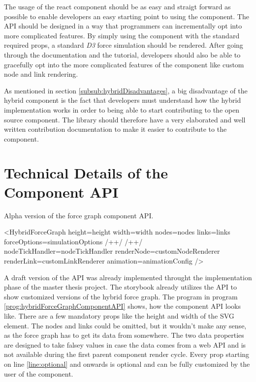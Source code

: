 The usage of the react component should be as easy and straigt forward as possible to enable developers an easy starting point to using the component. The API should be designed in a way that programmers can incrementally opt into more complicated features. By simply using the component with the standard required props, a standard \emph{D3} force simulation should be rendered. After going through the documentation and the tutorial, developers should also be able to gracefully opt into the more complicated features of the component like custom node and link rendering.

As mentioned in section \ref{subsub:hybridDisadvantages}, a big disadvantage of the hybrid component is the fact that developers must understand how the hybrid implementation works in order to being able to start contributing to the open source component. The library should therefore have a very elaborated and well written contribution documentation to make it easier to contribute to the component.

\section{Technical Details of the Component API}

\begin{program}
\caption{Alpha version of the force graph component API.}
\label{prog:hybridForceGraphComponentAPI}
\begin{JsCode}
<HybridForceGraph 
  height={height}
  width={width}
  nodes={nodes}
  links={links}
  forceOptions={simulationOptions} /+\label{line:foceOptions}+/ /+\label{line:optional}+/ 
  nodeTickHandler={nodeTickHandler}
  renderNode={customNodeRenderer}
  renderLink={customLinkRenderer}
  animation={animationConfig}
/>
\end{JsCode}
\end{program}

A draft version of the API was already implemented throught the implementation phase of the master thesis project. The storybook already utilizes the API to show customized versions of the hybrid force graph. The program in program \ref{prog:hybridForceGraphComponentAPI} shows, how the component API looks like. There are a few mandatory props like the height and width of the SVG element. The nodes and links could be omitted, but it wouldn't make any sense, as the force graph has to get its data from somewhere. The two data properties are designed to take falsey values in case the data comes from a web API and is not available during the first parent component render cycle. Every prop starting on line \ref{line:optional} and onwards is optional and can be fully customized by the user of the component.

